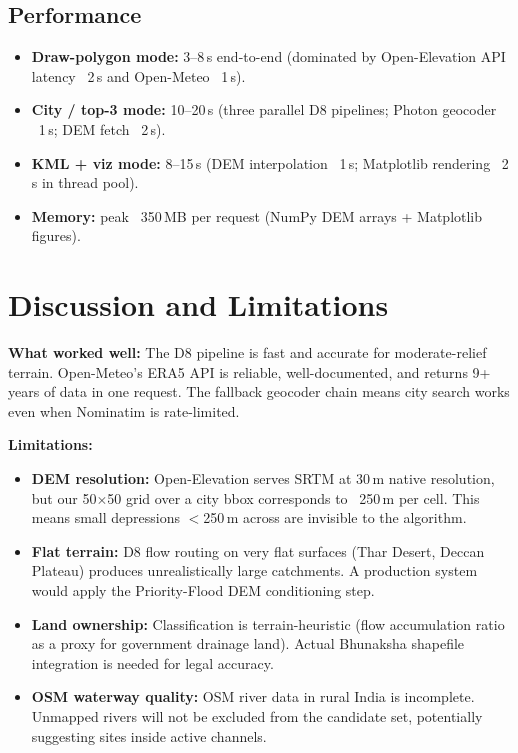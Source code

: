 \documentclass[manuscript,screen,review]{acmart}
\begin{document}
\subsection{Performance}

\begin{itemize}
  \item \textbf{Draw-polygon mode:} 3--8\,s end-to-end (dominated by Open-Elevation API latency ~2\,s and Open-Meteo ~1\,s).
  \item \textbf{City / top-3 mode:} 10--20\,s (three parallel D8 pipelines; Photon geocoder ~1\,s; DEM fetch ~2\,s).
  \item \textbf{KML + viz mode:} 8--15\,s (DEM interpolation ~1\,s; Matplotlib rendering ~2\,s in thread pool).
  \item \textbf{Memory:} peak ~350\,MB per request (NumPy DEM arrays + Matplotlib figures).
\end{itemize}

\section{Discussion and Limitations}
\label{sec:discussion}

\textbf{What worked well:} The D8 pipeline is fast and accurate for
moderate-relief terrain. Open-Meteo's ERA5 API is reliable,
well-documented, and returns 9+ years of data in one request.
The fallback geocoder chain means city search works even when
Nominatim is rate-limited.

\textbf{Limitations:}
\begin{itemize}
  \item \textbf{DEM resolution:} Open-Elevation serves SRTM at
    30\,m native resolution, but our 50$\times$50 grid over a city
    bbox corresponds to ~250\,m per cell. This means small depressions
    $<$250\,m across are invisible to the algorithm.
  \item \textbf{Flat terrain:} D8 flow routing on very flat surfaces
    (Thar Desert, Deccan Plateau) produces unrealistically large
    catchments. A production system would apply the Priority-Flood
    DEM conditioning step.
  \item \textbf{Land ownership:} Classification is terrain-heuristic
    (flow accumulation ratio as a proxy for government drainage land).
    Actual Bhunaksha shapefile integration is needed for legal accuracy.
  \item \textbf{OSM waterway quality:} OSM river data in rural India
    is incomplete. Unmapped rivers will not be excluded from the
    candidate set, potentially suggesting sites inside active channels.
\end{itemize}
\end{document}
